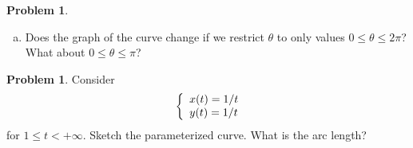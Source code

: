\documentclass[10pt]{article}
\theoremstyle{definition}
\newtheorem{problem}[theorem]{Problem}
\newcommand{\1}[1]{\textbf{1}_{\left[#1\right]}} %
\begin{document}
\begin{problem}
\begin{enumerate}[(a)]
    \item Does the graph of the curve change if we restrict $\theta$ to only values
    $0 \leq \theta \leq 2\pi$? What about $0 \leq \theta \leq \pi$?
  \end{enumerate}

  
 
\end{problem}



\begin{problem}
  Consider
  \begin{equation*}
    \left\{ \begin{array}{l@{}l} x(t)= 1/t \\ y(t) = 1/t \end{array}\right.
  \end{equation*}
  for $1 \leq t<+\infty$. Sketch the parameterized curve. What is the arc length?
\end{problem}
\end{document}
